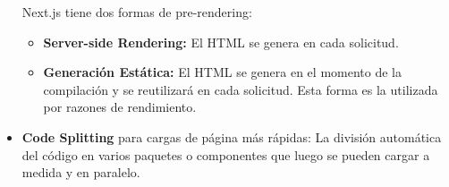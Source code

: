 \documentclass[12pt,twoside,titlepage]{report}
\begin{document}
\begin{itemize}
    Next.js tiene dos formas de pre-rendering:
    \begin{itemize}
        \item \textbf{Server-side Rendering:} El HTML se genera en cada solicitud. %
        \item \textbf{Generación Estática:} El HTML se genera en el momento de la compilación y se reutilizará en cada solicitud. Esta forma es la utilizada por razones de rendimiento. %
    \end{itemize}

    \item \textbf{Code Splitting} para cargas de página más rápidas: La división automática del código en varios paquetes o componentes que luego se pueden cargar a medida y en paralelo. 
    

\end{itemize}
\end{document}
